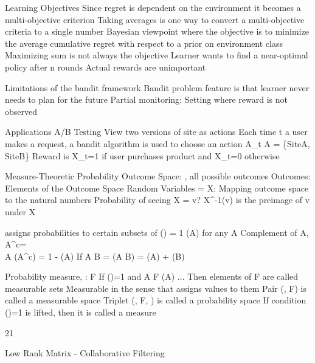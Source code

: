 Learning Objectives
	Since regret is dependent on the environment it becomes a multi-objective criterion
	Taking averages is one way to convert a multi-objective criteria to a single number
		Bayesian viewpoint where the objective is to minimize the average cumulative regret with respect to a prior on environment class
	Maximizing sum is not always the objective
		Learner wants to find a near-optimal policy after n rounds
		Actual rewards are unimportant

Limitations of the bandit framework
	Bandit problem feature is that learner never needs to plan for the future
	Partial monitoring: Setting where reward is not observed

Applications
	A/B Testing
		View two versions of site as actions
		Each time t a user makes a request, a bandit algorithm is used to choose an action A_{t} \in A = \{SiteA, SiteB\}
			Reward is X_{t}=1 if user purchases product and X_{t}=0 otherwise

Measure-Theoretic Probability
	Outcome Space: \Omega, all possible outcomes
		Outcomes: Elements of the Outcome Space
	Random Variables = X: \Omega \rightarrow \doubleN
		Mapping outcome space to the natural numbers
	Probability of seeing X = v?
		X^{-1}(v) is the preimage of v under X


	\doubleP assigns probabilities to certain subsets of \Omega
		\doubleP(\Omega) = 1
		\doubleP(A)  for any A \subset \Omega
		Complement of A, A^{c}=\Omega \\A
			\doubleP(A^{c}) = 1 - \doubleP(A)
		If A \cap B = \emptyset
			\doubleP(A \cup B) = \doubleP(A) + \doubleP(B)

	Probability measure, \doubleP: F \rightarrow \doubleR
		If \doubleP(\Omega)=1 and \forall A \in F \doubleP(A)  ...
		Then elements of F are called measurable sets
			Measurable in the sense that \doubleP assigns values to them
				Pair (\Omega, F) is called a measurable space
				Triplet (\Omega, F, \doubleP) is called a probability space
				If condition \doubleP(\Omega)=1 is lifted, then it is called a measure




21				






Low Rank Matrix - Collaborative Filtering
